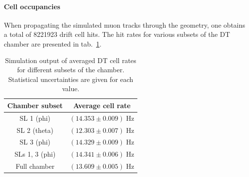 \paragraph{Cell occupancies}
When propagating the simulated muon tracks through the geometry, one obtains a total of \num{8221923} drift cell hits. The hit rates for various subsets of the \ac{DT} chamber are presented in tab.\ \ref{tab:Simulation-ChamberRates}.
\begin{table}[htb]
\centering  %
\begin{tabular}{|c|c|}
\hline
Chamber subset & Average cell rate \\ \hline
\ac{SL} 1 (phi) & $(14.353\pm 0.009)\;\si{\hertz}$ \\
\ac{SL} 2 (theta) & $(12.303 \pm 0.007)\;\si{\hertz}$ \\
\ac{SL} 3 (phi) & $(14.329 \pm 0.009)\;\si{\hertz}$ \\ \hline
\acp{SL} 1, 3 (phi) & $(14.341 \pm 0.006)\;\si{\hertz}$ \\ \hline
Full chamber & $(13.609 \pm 0.005)\;\si{\hertz}$ \\ \hline
\end{tabular}
\caption{Simulation output of averaged \ac{DT} cell rates for different subsets of the chamber. Statistical uncertainties are given for each value.}
\label{tab:Simulation-ChamberRates}
\end{table}

\FloatBarrier
